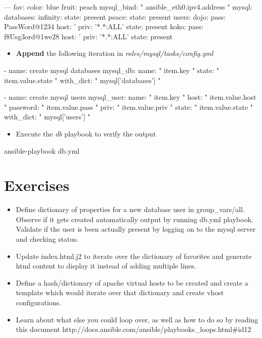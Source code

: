 \begin{code}
---
  fav:
    color: blue
    fruit: peach
  mysql_bind: "{{ ansible_eth0.ipv4.address }}"
  mysql:
    databases:
      infinity:
        state: present
      peace:
        state: present
    users:
      dojo:
        pass: PassWord@1234
        host: '%
        priv: '*.*:ALL'
        state: present
      koko:
        pass: f8Usg3ord@1we28
        host: '%
        priv: '*.*:ALL'
        state: present
\end{code}

\begin{itemize}
\item \textbf{Append} the following iteration in \emph{roles/mysql/tasks/config.yml}
\end{itemize}

\begin{code}
- name: create mysql databases
  mysql_db:
    name: "{{ item.key }}"
    state: "{{ item.value.state }}"
  with_dict: "{{ mysql['databases'] }}"

- name: create mysql users
  mysql_user:
    name: "{{ item.key }}"
    host: "{{ item.value.host }}"
    password: "{{ item.value.pass }}"
    priv: "{{ item.value.priv }}"
    state: "{{ item.value.state }}"
  with_dict: "{{ mysql['users'] }}"
\end{code}

\begin{itemize}
\item Execute the \emph{db} playbook to verify the output
\end{itemize}

\begin{code}
ansible-playbook db.yml
\end{code}

\section{Exercises}

\begin{itemize}
\item Define dictionary of properties for a new database user  in group\_vars/all. Observe if it gets created automatically  output by running db.yml playbook. Validate if the user is been actually present by logging on to the mysql server and checking status.
\item Update index.html.j2 to iterate over the dictionary of favorites and generate html content to display it instead of adding multiple lines.
\item Define a hash/dictionary  of apache virtual hosts to be created  and create a template which would iterate over that dictionary and create vhost configurations.
\item Learn about what else you could loop over, as well as how to do so by reading this document http://docs.ansible.com/ansible/playbooks\_loops.html\#id12
\end{itemize}